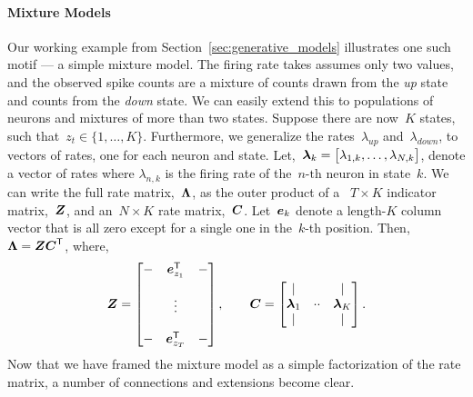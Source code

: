 \paragraph{Mixture Models}
Our working example from Section~\ref{sec:generative_models}
illustrates one such motif --- a simple mixture model.  The firing
rate takes assumes only two values, and the observed spike counts are
a mixture of counts drawn from the \textit{up} state and counts from
the \textit{down} state. We can easily extend this to populations of
neurons and mixtures of more than two states.  Suppose there are
now~$K$ states, such that~${z_t \in \{1, \ldots, K\}}$. Furthermore,
we generalize the rates~$\lambda_{\textit{up}}$
and~$\lambda_{\textit{down}}$, to vectors of rates, one for each
neuron and state.
Let,~${\boldsymbol{\lambda}_k = \big[ \lambda_{1,k}, \ldots, \lambda_{N,k}\big]}$,
denote a vector of rates where $\lambda_{n,k}$ is the firing rate of
the~${n\text{-th}}$ neuron in state~$k$.  We can write the full rate
matrix,~$\boldsymbol{\Lambda}$, as the outer product of a ~${T \times K}$
indicator matrix,~$\boldsymbol{Z}$, and an~${N \times K}$ rate
matrix,~$\boldsymbol{C}$. Let~$\boldsymbol{e}_k$ denote a length-$K$ column vector that is all zero
except for a single one in the~$k$-th position.
Then,~${\boldsymbol{\Lambda} = \boldsymbol{Z} \boldsymbol{C}^{\mathsf{T}}}$, where,
\begin{align}
  \boldsymbol{Z} = 
        \begin{bmatrix}
          - & \boldsymbol{e}_{z_1}^{\mathsf{T}} & - \\
            &                  &   \\
            &  \vdots          &   \\
            &                  &   \\
          - & \boldsymbol{e}_{z_T}^{\mathsf{T}} & - 
        \end{bmatrix}, 
  \qquad
  \boldsymbol{C} = 
        \begin{bmatrix}
          | &  & | \\
          \boldsymbol{\lambda}_1 & \cdot \cdot & \boldsymbol{\lambda}_K \\
          | &  & | 
        \end{bmatrix}.
\end{align}
Now that we have framed the mixture model as a simple factorization of 
the rate matrix, a number of connections and extensions become clear.

